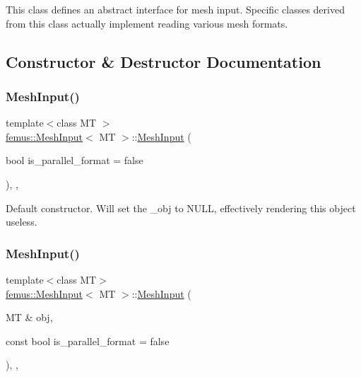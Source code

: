 This class defines an abstract interface for {\ttfamily mesh} input. Specific classes derived from this class actually implement reading various mesh formats. 

\subsection{Constructor \& Destructor Documentation}
\mbox{\label{classfemus_1_1_mesh_input_a06a1295a7998ff9a5ebb2ee64d232db9}} 
\subsubsection{\texorpdfstring{Mesh\+Input()}{MeshInput()}\hspace{0.1cm}{\footnotesize\ttfamily [1/2]}}
{\footnotesize\ttfamily template$<$class MT $>$ \\
\mbox{\hyperlink{classfemus_1_1_mesh_input}{femus\+::\+Mesh\+Input}}$<$ MT $>$\+::\mbox{\hyperlink{classfemus_1_1_mesh_input}{Mesh\+Input}} (\begin{DoxyParamCaption}\item[{bool}]{is\+\_\+parallel\+\_\+format = {\ttfamily false} }\end{DoxyParamCaption})\hspace{0.3cm}{\ttfamily [inline]}, {\ttfamily [explicit]}, {\ttfamily [protected]}}

Default constructor. Will set the \+\_\+obj to N\+U\+LL, effectively rendering this object useless. \mbox{\label{classfemus_1_1_mesh_input_a774f8159ef1e7721f92ff001034e9775}} 
\subsubsection{\texorpdfstring{Mesh\+Input()}{MeshInput()}\hspace{0.1cm}{\footnotesize\ttfamily [2/2]}}
{\footnotesize\ttfamily template$<$class MT$>$ \\
\mbox{\hyperlink{classfemus_1_1_mesh_input}{femus\+::\+Mesh\+Input}}$<$ MT $>$\+::\mbox{\hyperlink{classfemus_1_1_mesh_input}{Mesh\+Input}} (\begin{DoxyParamCaption}\item[{MT \&}]{obj,  }\item[{const bool}]{is\+\_\+parallel\+\_\+format = {\ttfamily false} }\end{DoxyParamCaption})\hspace{0.3cm}{\ttfamily [inline]}, {\ttfamily [explicit]}, {\ttfamily [protected]}}

